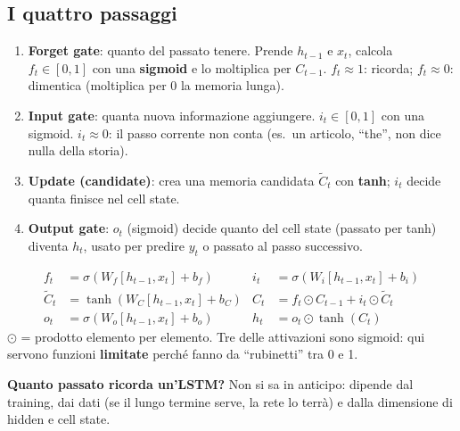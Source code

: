 \subsection{I quattro passaggi}
\begin{enumerate}
  \item \textbf{Forget gate}: quanto del passato tenere. Prende $h_{t-1}$ e $x_t$, calcola $f_t\in[0,1]$ con una \textbf{sigmoid} e lo
        moltiplica per $C_{t-1}$. $f_t\approx1$: ricorda; $f_t\approx 0$: dimentica (moltiplica per 0 la memoria lunga).
  \item \textbf{Input gate}: quanta nuova informazione aggiungere. $i_t\in[0,1]$ con una sigmoid. $i_t\approx 0$: il passo corrente non
        conta (es.\ un articolo, ``the'', non dice nulla della storia).
  \item \textbf{Update (candidate)}: crea una memoria candidata $\tilde C_t$ con \textbf{tanh}; $i_t$ decide quanta finisce nel cell state.
  \item \textbf{Output gate}: $o_t$ (sigmoid) decide quanto del cell state (passato per tanh) diventa $h_t$, usato per predire $y_t$ o
        passato al passo successivo.
\end{enumerate}
\begin{integrazione}
\begin{align*}
f_t &= \sigma(W_f[h_{t-1}, x_t] + b_f) & i_t &= \sigma(W_i[h_{t-1}, x_t] + b_i)\\
\tilde C_t &= \tanh(W_C[h_{t-1}, x_t] + b_C) & C_t &= f_t \odot C_{t-1} + i_t \odot \tilde C_t\\
o_t &= \sigma(W_o[h_{t-1}, x_t] + b_o) & h_t &= o_t \odot \tanh(C_t)
\end{align*}
$\odot$ = prodotto elemento per elemento. Tre delle attivazioni sono sigmoid: qui servono funzioni \textbf{limitate} perché fanno da
``rubinetti'' tra 0 e 1.
\end{integrazione}
\textbf{Quanto passato ricorda un'LSTM?} Non si sa in anticipo: dipende dal training, dai dati (se il lungo termine serve, la rete lo
terrà) e dalla dimensione di hidden e cell state.

